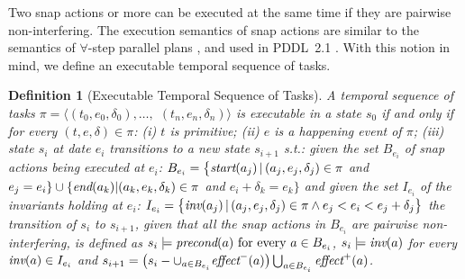 \documentclass[letterpaper]{article} %
\newtheorem{definition}{Definition}
\newcommand{\pre}{\text{\it precond}}
\newcommand{\add}{\text{\it effect}^{+}}
\newcommand{\del}{\text{\it effect}^{-}}
\newcommand{\tstart}{\text{\it start}}
\newcommand{\tend}{\text{\it end}}
\newcommand{\tinv}{\text{\it inv}}
\begin{document}
Two snap actions or more can be executed at the same time if they are pairwise non-interfering. The execution semantics of snap actions are similar to the semantics of $\forall$-step parallel plans \cite{rintanen06}, and used in PDDL~2.1 \cite{fox03}. With this notion in mind, we define an executable temporal sequence of tasks.

\begin{definition}[Executable Temporal Sequence of Tasks]
\label{def:exTST}
  A temporal sequence of tasks $\pi = \langle (t_0, e_0, \delta_0), \ldots,$ $(t_n, e_n, \delta_n) \rangle$ is executable in a state $s_0$ if and only if for every $(t, e, \delta)\! \in \!\pi$:
  (i) $t$ is primitive;
  (ii) $e$ is a happening event of $\pi$;
  (iii) %
  state $s_i$ at date $e_i$ transitions to a new state $s_{i+1}$ s.t.:
  given the set $B_{e_i}$ of snap actions being executed at $e_i$:
      $B_{e_i} = \bigl\{ \tstart(a_j) \,| \, (a_j, e_j, \delta_j) \in \pi$  and $e_j = e_i \}
      \cup  \{\tend(a_k)  | (a_k, e_k, \delta_k) \in \pi$ and $e_i + \delta_k = e_k\bigr\}$
     and given the set $I_{e_i}$ of the invariants holding at $e_i$:
      $I_{e_i} = \bigl\{ \tinv(a_j) \, | \, (a_j, e_j, \delta_j) \in \pi \wedge e_j < e_i < e_j + \delta_j\bigr\}$
    the transition of $s_i$ to  $s_{i+1}$, given that all the snap actions in $B_{e_i}$ are \emph{pairwise non-interfering}, is defined as   %
       $s_i \models \pre(a) \text{ for every } a \in B_{e_i}$,
       $s_i \models \tinv(a)$  for every $\tinv(a) \in I_{e_i}$ and
       \mbox{$s_{i+1} = \left(s_i - \cup_{a \in B_{e_i}} \del(a)\right) \bigcup_{a \in B_{e_i}} \add(a)$.}
%
%
\end{definition}
\end{document}
